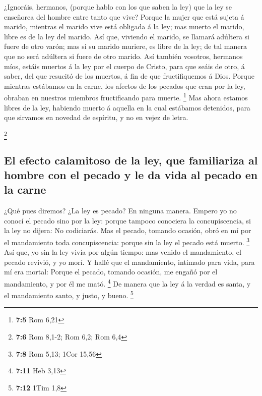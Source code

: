  ¿Ignoráis, hermanos, (porque hablo con los que saben la
ley) que la ley se enseñorea del hombre entre tanto que vive?
 Porque la mujer que está sujeta á marido, mientras el
marido vive está obligada á la ley; mas muerto el marido, libre es de la
ley del marido.  Así que, viviendo el marido, se llamará
adúltera si fuere de otro varón; mas si su marido muriere, es libre de
la ley; de tal manera que no será adúltera si fuere de otro marido.
 Así también vosotros, hermanos míos, estáis muertos á la
ley por el cuerpo de Cristo, para que seáis de otro, á saber, del que
resucitó de los muertos, á fin de que fructifiquemos á Dios.
 Porque mientras estábamos en la carne, los afectos de los
pecados que eran por la ley, obraban en nuestros miembros fructificando
para muerte. \footnote{\textbf{7:5} Rom 6,21}  Mas ahora
estamos libres de la ley, habiendo muerto á aquella en la cual estábamos
detenidos, para que sirvamos en novedad de espíritu, y no en vejez de
letra.

\footnote{\textbf{7:6} Rom 8,1-2; Rom 6,2; Rom 6,4}

\hypertarget{el-efecto-calamitoso-de-la-ley-que-familiariza-al-hombre-con-el-pecado-y-le-da-vida-al-pecado-en-la-carne}{%
\subsection{El efecto calamitoso de la ley, que familiariza al hombre
con el pecado y le da vida al pecado en la
carne}\label{el-efecto-calamitoso-de-la-ley-que-familiariza-al-hombre-con-el-pecado-y-le-da-vida-al-pecado-en-la-carne}}

 ¿Qué pues diremos? ¿La ley es pecado? En ninguna manera.
Empero yo no conocí el pecado sino por la ley: porque tampoco conociera
la concupiscencia, si la ley no dijera: No codiciarás.  Mas
el pecado, tomando ocasión, obró en mí por el mandamiento toda
concupiscencia: porque sin la ley el pecado está muerto. \footnote{\textbf{7:8}
  Rom 5,13; 1Cor 15,56}  Así que, yo sin la ley vivía por
algún tiempo: mas venido el mandamiento, el pecado revivió, y yo morí.
 Y hallé que el mandamiento, intimado para vida, para mí
era mortal:  Porque el pecado, tomando ocasión, me engañó
por el mandamiento, y por él me mató. \footnote{\textbf{7:11} Heb 3,13}
 De manera que la ley á la verdad es santa, y el
mandamiento santo, y justo, y bueno. \footnote{\textbf{7:12} 1Tim 1,8}

